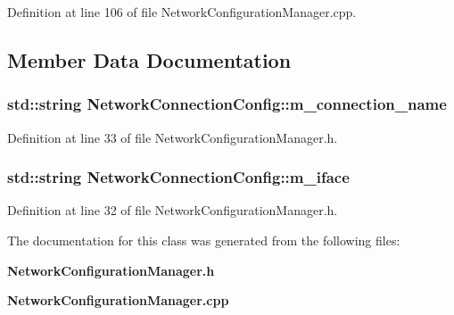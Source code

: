 \-Definition at line 106 of file \-Network\-Configuration\-Manager.\-cpp.



\subsection{\-Member \-Data \-Documentation}
\subsubsection[{m\-\_\-connection\-\_\-name}]{\setlength{\rightskip}{0pt plus 5cm}std\-::string {\bf \-Network\-Connection\-Config\-::m\-\_\-connection\-\_\-name}\hspace{0.3cm}{\ttfamily  [private]}}\label{classNetworkConnectionConfig_a2e287665f93f21d4f8d6398965b92e12}


\-Definition at line 33 of file \-Network\-Configuration\-Manager.\-h.

\subsubsection[{m\-\_\-iface}]{\setlength{\rightskip}{0pt plus 5cm}std\-::string {\bf \-Network\-Connection\-Config\-::m\-\_\-iface}\hspace{0.3cm}{\ttfamily  [private]}}\label{classNetworkConnectionConfig_a7b71395d73455b55aa554c948ccd8dfa}


\-Definition at line 32 of file \-Network\-Configuration\-Manager.\-h.



\-The documentation for this class was generated from the following files\-:\begin{DoxyCompactItemize}
\item 
{\bf \-Network\-Configuration\-Manager.\-h}\item 
{\bf \-Network\-Configuration\-Manager.\-cpp}\end{DoxyCompactItemize}
